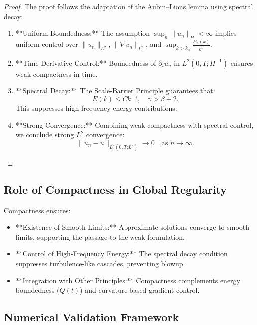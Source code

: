 \documentclass[12pt]{article}
\theoremstyle{definition}
\begin{document}
\begin{proof}
The proof follows the adaptation of the Aubin--Lions lemma using spectral decay:
\begin{enumerate}
    \item **Uniform Boundedness:** The assumption $\sup_n \|u_n\|_H < \infty$ implies uniform control over $\|u_n\|_{L^2}$, $\|\nabla u_n\|_{L^2}$, and $\sup_{k > k_0} \frac{E_n(k)}{k^\beta}$.
    \item **Time Derivative Control:** Boundedness of $\partial_t u_n$ in $L^2(0, T; H^{-1})$ ensures weak compactness in time.
    \item **Spectral Decay:** The Scale-Barrier Principle guarantees that:
    \begin{equation}
    E(k) \leq C k^{-\gamma}, \quad \gamma > \beta + 2.
    \end{equation}
    This suppresses high-frequency energy contributions.
    \item **Strong Convergence:** Combining weak compactness with spectral control, we conclude strong $L^2$ convergence:
    \begin{equation}
    \|u_n - u\|_{L^2(0, T; L^2)} \to 0 \quad \text{as } n \to \infty.
    \end{equation}
\end{enumerate}
\end{proof}

\subsection{Role of Compactness in Global Regularity}
Compactness ensures:
\begin{itemize}
    \item **Existence of Smooth Limits:** Approximate solutions converge to smooth limits, supporting the passage to the weak formulation.
    \item **Control of High-Frequency Energy:** The spectral decay condition suppresses turbulence-like cascades, preventing blowup.
    \item **Integration with Other Principles:** Compactness complements energy boundedness ($Q(t)$) and curvature-based gradient control.
\end{itemize}

\subsection{Numerical Validation Framework}
\end{document}
